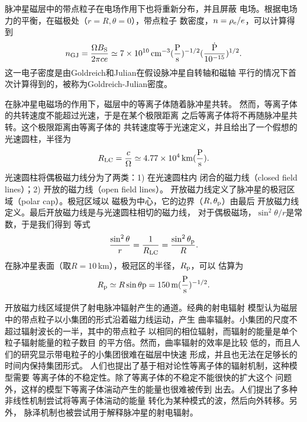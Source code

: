 脉冲星磁层中的带点粒子在电场作用下也将重新分布，并且屏蔽
电场。根据电场力的平衡，在磁极处（$r=R,\theta=0$），带点粒子
数密度，$n=\rho_{\rm{e}}/e$，可以计算得到
\begin{equation}
n_{\rm{GJ}}=\frac{\Omega B_{\rm{S}}}{2\pi ce}\simeq 7\times10^{10}\,\rm{cm^{-3}}(\frac{P}{s})^{-1/2}(\frac{\dot{P}}{10^{-15}})^{1/2}.
\end{equation}
这一电子密度是由Goldreich和Julian在假设脉冲星自转轴和磁轴
平行的情况下首次计算得到的\supercite{gj69}，被称为Goldreich-Julian密度。

在脉冲星电磁场的作用下，磁层中的等离子体随着脉冲星共转。
然而，等离子体的共转速度不能超过光速，于是在某个极限距离
之后等离子体将不再随脉冲星共转。这个极限距离由等离子体的
共转速度等于光速定义，并且给出了一个假想的光速圆柱，半径为
\begin{equation}
R_{\rm{LC}}=\frac{c}{\Omega}\simeq 4.77\times10^{4}\,\rm{km}(\frac{P}{s}).
\end{equation}
光速圆柱将偶极磁力线分为了两类：1) 在光速圆柱内
闭合的磁力线（closed field lines）；2) 开放的磁力线（open field lines）。
开放磁力线定义了脉冲星的极冠区域（polar cap）。极冠区域以
磁极为中心，它的边界（$R,\theta_{\rm{p}}$）由最后
开放磁力线定义。最后开放磁力线是与光速圆柱相切的磁力线，
对于偶极磁场，$\sin^{2}{\theta}/r$是常数，于是我们得到
等式
\begin{equation}
\frac{\sin^{2}{\theta}}{r}=\frac{1}{R_{\rm{LC}}}=\frac{\sin^{2}{\theta_{\rm{p}}}}{R}.
\end{equation}
在脉冲星表面（取$R=10$\,km），极冠区的半径，$R_{\rm{p}}$，可以
估算为
\begin{equation}
R_{\rm{p}}\simeq R\sin{\theta{\rm{p}}}=150\,\rm{m}(\frac{P}{s})^{-1/2}.
\end{equation}

开放磁力线区域提供了射电脉冲辐射产生的通道。经典的射电辐射
模型认为磁层中的带点粒子以小集团的形式沿着磁力线运动，产生
曲率辐射。小集团的尺度不超过辐射波长的一半，其中的带点粒子
以相同的相位辐射，而辐射的能量是单个粒子辐射能量的粒子数目
的平方倍\supercite{kom70,rs75}。然而，曲率辐射的效率是比较
低的，而且人们的研究显示带电粒子的小集团很难在磁层中快速
形成，并且也无法在足够长的时间内保持集团形式\supercite{mel92}。
人们也提出了基于相对论性等离子体的辐射机制，这种模型需要
等离子体的不稳定性。除了等离子体的不稳定不能很快的扩大这个
问题外，这样的模型下等离子体湍动产生的能量也很难被传到
出去。人们提出了多种非线性机制尝试将等离子体湍动的能量
转化为某种模式的波，然后向外转移\supercite{mel92}。另外，
脉泽机制也被尝试用于解释脉冲星的射电辐射\supercite{mel89}。

